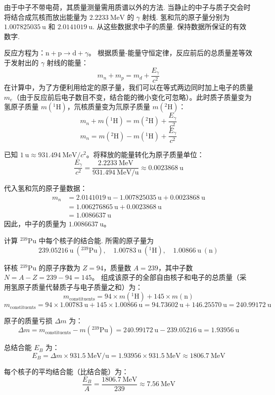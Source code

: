 \begin{exercise}\label{ex:29.6}
由于中子不带电荷，其质量测量需用质谱以外的方法. 当静止的中子与质子交会时将结合成氘核而放出能量为 $2.2233 \ \mathrm{MeV}$ 的 $\gamma$ 射线. 氢和氘的原子量分别为 $1.007825035 \ \mathrm{u}$ 和 $2.0141019 \ \mathrm{u}$. 从这些数据求中子的质量. 保持数据所保证的有效数字.
\end{exercise}
\begin{solution}
反应方程为：$\mathrm{n} + \mathrm{p} \rightarrow \mathrm{d} + \gamma$。
根据质量-能量守恒定律，反应前后的总质量差等效于发射出的 $\gamma$ 射线的能量：
$$ m_n + m_p = m_d + \frac{E_\gamma}{c^2} $$
在计算中，为了方便利用给定的原子量，我们可以在等式两边同时加上电子的质量 $m_e$（由于反应前后电子数目不变，结合能的微小变化可忽略）。此时质子质量变为氢原子质量 $m(^1\mathrm{H})$，氘核质量变为氘原子质量 $m(^2\mathrm{H})$：
$$ m_n + m(^1\mathrm{H}) = m(^2\mathrm{H}) + \frac{E_\gamma}{c^2} $$
$$ m_n = m(^2\mathrm{H}) - m(^1\mathrm{H}) + \frac{E_\gamma}{c^2} $$

已知 $1 \ \mathrm{u} \approx 931.494 \ \mathrm{MeV}/c^2$。将释放的能量转化为原子质量单位：
$$ \frac{E_\gamma}{c^2} = \frac{2.2233 \ \mathrm{MeV}}{931.494 \ \mathrm{MeV/u}} \approx 0.0023868 \ \mathrm{u} $$

代入氢和氘的原子量数据：
\begin{align*}
    m_n &= 2.0141019 \ \mathrm{u} - 1.007825035 \ \mathrm{u} + 0.0023868 \ \mathrm{u} \\
        &= 1.006276865 \ \mathrm{u} + 0.0023868 \ \mathrm{u} \\
        &= 1.0086637 \ \mathrm{u}
\end{align*}
因此，中子的质量为 $1.0086637 \ \mathrm{u}$。
\end{solution}

\begin{exercise}\label{ex:29.7}
计算 $^{239}\mathrm{Pu}$ 中每个核子的结合能. 所需的原子量为
$$ 239.05216 \ \mathrm{u} \ (^{239}\mathrm{Pu}), \quad 1.00783 \ \mathrm{u} \ (^1\mathrm{H}), \quad 1.00866 \ \mathrm{u} \ (\mathrm{n}) $$
\end{exercise}
\begin{solution}
钚核 $^{239}\mathrm{Pu}$ 的原子序数为 $Z = 94$，质量数 $A = 239$，其中子数 $N = A - Z = 239 - 94 = 145$。
组成该原子的全部自由核子和电子的总质量（采用氢原子质量代替质子与电子质量之和）为：
$$ m_{\text{constituents}} = 94 \times m(^1\mathrm{H}) + 145 \times m(\mathrm{n}) $$
$$ m_{\text{constituents}} = 94 \times 1.00783 \ \mathrm{u} + 145 \times 1.00866 \ \mathrm{u} = 94.73602 \ \mathrm{u} + 146.25570 \ \mathrm{u} = 240.99172 \ \mathrm{u} $$

原子的质量亏损 $\Delta m$ 为：
$$ \Delta m = m_{\text{constituents}} - m(^{239}\mathrm{Pu}) = 240.99172 \ \mathrm{u} - 239.05216 \ \mathrm{u} = 1.93956 \ \mathrm{u} $$

总结合能 $E_B$ 为：
$$ E_B = \Delta m \times 931.5 \ \mathrm{MeV/u} = 1.93956 \times 931.5 \ \mathrm{MeV} \approx 1806.7 \ \mathrm{MeV} $$

每个核子的平均结合能（比结合能）为：
$$ \frac{E_B}{A} = \frac{1806.7 \ \mathrm{MeV}}{239} \approx 7.56 \ \mathrm{MeV} $$
\end{solution}

